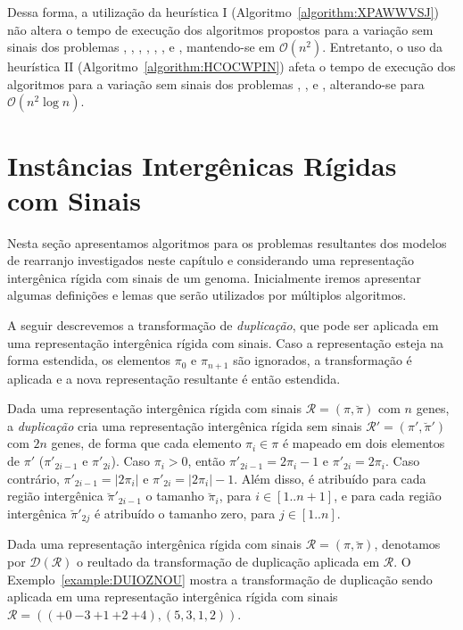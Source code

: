Dessa forma, a utilização da heurística I (Algoritmo~\ref{algorithm:XPAWWVSJ}) não altera o tempo de execução dos algoritmos propostos para a variação sem sinais dos problemas \SbIR{}, \SbIRI{}, \SbIRM{}, \SbIRMI{}, \SbIRT{}, \SbIRTI{}, \SbIRTM{} e \SbIRTMI{}, mantendo-se em $\mathcal{O}(n^2)$. Entretanto, o uso da heurística II (Algoritmo~\ref{algorithm:HCOCWPIN}) afeta o tempo de execução dos algoritmos para a variação sem sinais dos problemas \SbIRM{}, \SbIRMI{}, \SbIRTM{} e \SbIRTMI{}, alterando-se para $\mathcal{O}(n^2 \log n)$.

\section{Instâncias Intergênicas Rígidas com Sinais}

Nesta seção apresentamos algoritmos para os problemas resultantes dos modelos de rearranjo investigados neste capítulo e considerando uma representação intergênica rígida com sinais de um genoma. Inicialmente iremos apresentar algumas definições e lemas que serão utilizados por múltiplos algoritmos.

A seguir descrevemos a transformação de \emph{duplicação}, que pode ser aplicada em uma representação intergênica rígida com sinais. Caso a representação esteja na forma estendida, os elementos $\pi_0$ e $\pi_{n+1}$ são ignorados, a transformação é aplicada e a nova representação resultante é então estendida.

\begin{definition}
Dada uma representação intergênica rígida com sinais $\mathcal{R}=(\pi,\breve\pi)$ com $n$ genes, a \emph{duplicação} cria uma representação intergênica rígida sem sinais $\mathcal{R'}=(\pi',\breve\pi')$ com $2n$ genes, de forma que cada elemento $\pi_i \in \pi$ é mapeado em dois elementos de $\pi'$ ($\pi'_{2i-1}$ e $\pi'_{2i}$). Caso $\pi_i > 0$, então $\pi'_{2i-1} = 2\pi_i-1$ e $\pi'_{2i} = 2\pi_i$. Caso contrário, $\pi'_{2i-1} = |2\pi_i|$ e $\pi'_{2i} = |2\pi_i|-1$. Além disso, é atribuído para cada região intergênica $\breve\pi'_{2i-1}$ o tamanho $\breve\pi_i$, para $i\in[1..{n+1}]$, e para cada região intergênica $\breve\pi'_{2j}$ é atribuído o tamanho zero, para $j\in[1..n]$.
\end{definition}

Dada uma representação intergênica rígida com sinais $\mathcal{R}=(\pi,\breve\pi)$, denotamos por $\mathcal{D}(\mathcal{R})$ o reultado da transformação de duplicação aplicada em $\mathcal{R}$. O Exemplo~\ref{example:DUIOZNOU} mostra a transformação de duplicação sendo aplicada em uma representação intergênica rígida com sinais $\mathcal{R}=(({+0}~{-3}~{+1}~{+2}~{+4}),(5,3,1,2))$.

